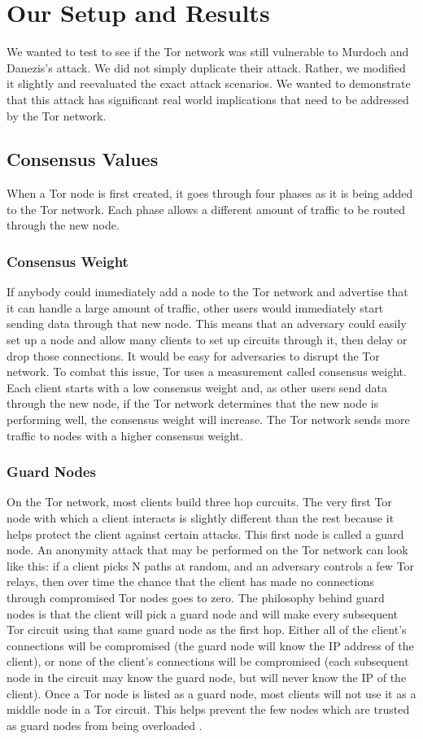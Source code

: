 \documentclass[12pt,journal]{IEEEtran}
\begin{document}
\section{Our Setup and Results}
We wanted to test to see if the Tor network was still vulnerable to Murdoch and Danezis's attack. We did not simply duplicate their attack. Rather, we modified it slightly and reevaluated the exact attack scenarios. We wanted to demonstrate that this attack has significant real world implications that need to be addressed by the Tor network.
\subsection{Consensus Values}
When a Tor node is first created, it goes through four phases as it is being added to the Tor network. Each phase allows a different amount of traffic to be routed through the new node.
\subsubsection{Consensus Weight}
If anybody could immediately add a node to the Tor network and advertise that it can handle a large amount of traffic, other users would immediately start sending data through that new node. This means that an adversary could easily set up a node and allow many clients to set up circuits through it, then delay or drop those connections. It would be easy for adversaries to disrupt the Tor network. To combat this issue, Tor uses a measurement called consensus weight. Each client starts with a low consensus weight and, as other users send data through the new node, if the Tor network determines that the new node is performing well, the consensus weight will increase. The Tor network sends more traffic to nodes with a higher consensus weight.
\subsubsection{Guard Nodes}
On the Tor network, most clients build three hop curcuits. The very first Tor node with which a client interacts is slightly different than the rest because it helps protect the client against certain attacks. This first node is called a guard node. An anonymity attack that may be performed on the Tor network can look like this: if a client picks N paths at random, and an adversary controls a few Tor relays, then over time the chance that the client has made no connections through compromised Tor nodes goes to zero. The philosophy behind guard nodes is that the client will pick a guard node and will make every subsequent Tor circuit using that same guard node as the first hop. Either all of the client's connections will be compromised (the guard node will know the IP address of the client), or none of the client's connections will be compromised (each subsequent node in the circuit may know the guard node, but will never know the IP of the client). Once a Tor node is listed as a guard node, most clients will not use it as a middle node in a Tor circuit. This helps prevent the few nodes which are trusted as guard nodes from being overloaded \cite{arma2013}.
\end{document}
